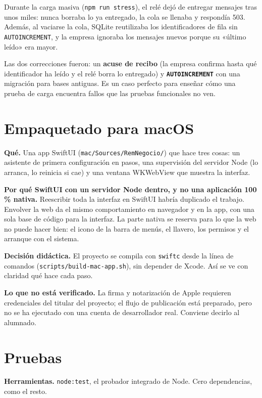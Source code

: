 Durante la carga masiva (\texttt{npm\ run\ stress}), el relé dejó de entregar mensajes tras unos miles: nunca borraba lo ya entregado, la cola se llenaba y respondía 503. Además, al vaciarse la cola, SQLite reutilizaba los identificadores de fila sin \texttt{AUTOINCREMENT}, y la empresa ignoraba los mensajes nuevos porque su «último leído» era mayor.

Las dos correcciones fueron: un \textbf{acuse de recibo} (la empresa confirma hasta qué identificador ha leído y el relé borra lo entregado) y \textbf{\texttt{AUTOINCREMENT}} con una migración para bases antiguas. Es un caso perfecto para enseñar cómo una prueba de carga encuentra fallos que las pruebas funcionales no ven.

\chapter{Empaquetado para macOS}\label{empaquetado-para-macos}

\textbf{Qué.} Una app SwiftUI (\texttt{mac/Sources/RemNegocio/}) que hace tres cosas: un asistente de primera configuración en pasos, una supervisión del servidor Node (lo arranca, lo reinicia si cae) y una ventana WKWebView que muestra la interfaz.

\textbf{Por qué SwiftUI con un servidor Node dentro, y no una aplicación 100 \% nativa.} Reescribir toda la interfaz en SwiftUI habría duplicado el trabajo. Envolver la web da el mismo comportamiento en navegador y en la app, con una sola base de código para la interfaz. La parte nativa se reserva para lo que la web no puede hacer bien: el icono de la barra de menús, el llavero, los permisos y el arranque con el sistema.

\textbf{Decisión didáctica.} El proyecto se compila con \texttt{swiftc} desde la línea de comandos (\texttt{scripts/build-mac-app.sh}), sin depender de Xcode. Así se ve con claridad qué hace cada paso.

\textbf{Lo que no está verificado.} La firma y notarización de Apple requieren credenciales del titular del proyecto; el flujo de publicación está preparado, pero no se ha ejecutado con una cuenta de desarrollador real. Conviene decirlo al alumnado.

\chapter{Pruebas}\label{cap:pruebas}\label{pruebas}

\textbf{Herramientas.} \texttt{node:test}, el probador integrado de Node. Cero dependencias, como el resto.

